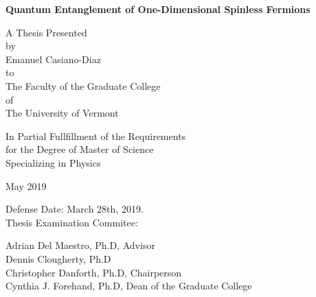 \documentclass[12pt, two sided]{report}
\begin{document}
\begin{titlepage}
	\begin{center}
		\vspace*{1cm}
				
		\Large
		\textbf{Quantum Entanglement of One-Dimensional Spinless Fermions}
		
		\vspace{0.9cm}
		
		
		\normalsize
		A Thesis Presented \\
		\vspace{0.4cm}
		by \\
		\vspace{0.4cm}
		Emanuel Casiano-Diaz \\
		\vspace{0.4cm}
		to \\
		\vspace{0.4cm}
		The Faculty of the Graduate College \\
		\vspace{0.4cm}
		of \\
		\vspace{0.4cm}
		The University of Vermont
		
		\vspace{0.7cm}

	
		In Partial Fullfillment of the Requirements \\
		for the Degree of Master of Science \\
		Specializing in Physics	
			
		\vspace{0.5cm}
		
		May 2019
		
	\end{center}
	
	\vspace{0.1cm}
	
	\begin{flushright}
		Defense Date: March 28th, 2019. \\
		Thesis Examination Commitee:
		
		\vspace{0.15cm}
		
		Adrian Del Maestro, Ph.D, Advisor \\
		Dennis Clougherty, Ph.D \\
		Christopher Danforth, Ph.D, Chairperson \\
		Cynthia J. Forehand, Ph.D, Dean of the Graduate College
		
	
	\end{flushright}
\end{titlepage}
\end{document}
